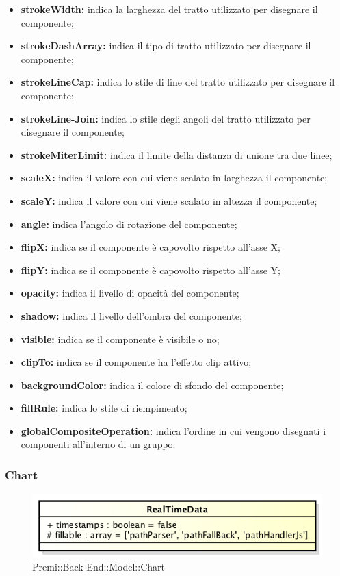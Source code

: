 \begin{itemize}
\begin{itemize}
			\item \textbf{strokeWidth:} indica la larghezza del tratto utilizzato per disegnare il componente;
			\item \textbf{strokeDashArray:} indica il tipo di tratto utilizzato per disegnare il componente;
			\item \textbf{strokeLineCap:} indica lo stile di fine del tratto utilizzato per disegnare il componente;
			\item \textbf{strokeLine-Join:} indica lo stile degli angoli del tratto utilizzato per disegnare il componente;
			\item \textbf{strokeMiterLimit:} indica il limite della distanza di unione tra due linee;
			\item \textbf{scaleX:} indica il valore con cui viene scalato in larghezza il componente;
			\item \textbf{scaleY:} indica il valore con cui viene scalato in altezza il componente;
			\item \textbf{angle:} indica l'angolo di rotazione del componente;
			\item \textbf{flipX:} indica se il componente è capovolto rispetto all'asse X;
			\item \textbf{flipY:} indica se il componente è capovolto rispetto all'asse Y;
			\item \textbf{opacity:} indica il livello di opacità del componente;
			\item \textbf{shadow:} indica il livello dell'ombra del componente;
			\item \textbf{visible:} indica  se il componente è visibile o no;
			\item \textbf{clipTo:} indica se il componente ha l'effetto clip attivo;
			\item \textbf{backgroundColor:} indica il colore di sfondo del componente;
			\item \textbf{fillRule:} indica lo stile di riempimento;
			\item \textbf{globalCompositeOperation:} indica l'ordine in cui vengono disegnati i componenti all'interno di un gruppo.
		\end{itemize}
	\end{itemize}
\newpage

\subsubsection{Chart}

	\begin{figure}[h]
		\centering
		\includegraphics[width=0.5\linewidth]{img/back_end_premi_model_realTimeData}
		\caption[Premi::Back-End::Model::Chart]{Premi::Back-End::Model::Chart}
		\label{fig:back_end_premi_model_chart}
	\end{figure}

